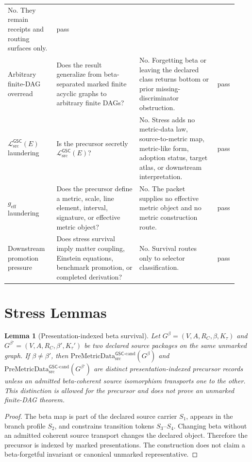 \documentclass[11pt]{article}
\newcommand{\PreMetricData}{\mathrm{PreMetricData}_{\mathrm{src}}^{\mathsf{GSC}\mbox{-}\mathrm{cand}}}
\newcommand{\MetricData}{\mathcal{L}_{\mathrm{src}}^{\mathsf{GSC}}}
\newcommand{\Gbeta}{G^\beta}
\newcommand{\geff}{g_{\mathrm{eff}}}
\newcommand{\Ktau}{K_\tau}
\newtheorem{lemma}{Lemma}
\begin{document}
\begin{longtable}{p{0.20\linewidth}p{0.34\linewidth}p{0.32\linewidth}p{0.08\linewidth}}
No. They remain receipts and routing surfaces only. &
pass \\
Arbitrary finite-DAG overread &
Does the result generalize from beta-separated marked finite acyclic graphs to
arbitrary finite DAGs? &
No. Forgetting beta or leaving the declared class returns bottom or prior
missing-discriminator obstruction. &
pass \\
\(\MetricData(E)\) laundering &
Is the precursor secretly \(\MetricData(E)\)? &
No. Stress adds no metric-data law, source-to-metric map, metric-like form,
adoption status, target atlas, or downstream interpretation. &
pass \\
\(\geff\) laundering &
Does the precursor define a metric, scale, line element, interval, signature,
or effective metric object? &
No. The packet supplies no effective metric object and no metric construction
route. &
pass \\
Downstream promotion pressure &
Does stress survival imply matter coupling, Einstein equations, benchmark
promotion, or completed derivation? &
No. Survival routes only to selector classification. &
pass \\
\bottomrule
\end{longtable}

\section{Stress Lemmas}

\begin{lemma}[Presentation-indexed beta survival]
Let \(\Gbeta=(V,A,R_C,\beta,\Ktau)\) and
\(G^{\beta'}=(V,A,R_C,\beta',K_{\tau}')\) be two declared source packages on
the same unmarked graph. If \(\beta\ne\beta'\), then
\(\PreMetricData(\Gbeta)\) and \(\PreMetricData(G^{\beta'})\) are distinct
presentation-indexed precursor records unless an admitted beta-coherent source
isomorphism transports one to the other. This distinction is allowed for the
precursor and does not prove an unmarked finite-DAG theorem.
\end{lemma}

\begin{proof}
The beta map is part of the declared source carrier \(S_1\), appears in the
branch profile \(S_2\), and constrains transition tokens \(S_3\)--\(S_4\).
Changing beta without an admitted coherent source transport changes the
declared object. Therefore the precursor is indexed by marked presentations.
The construction does not claim a beta-forgetful invariant or canonical
unmarked representative.
\end{proof}
\end{document}
